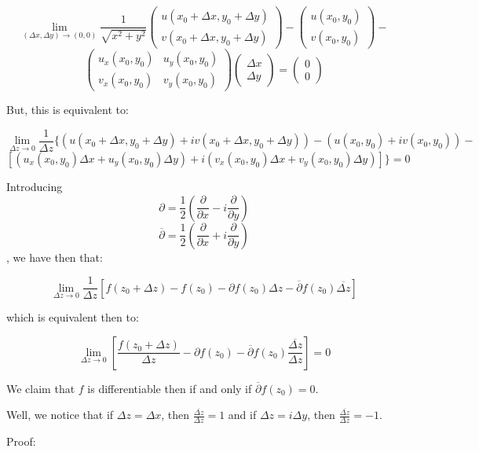 \documentclass[10pt]{article}
\begin{document}
$$ \lim_{(\Delta x, \Delta y) \to (0,0)} \frac{1}{\sqrt{x^2 + y^2}} \begin{pmatrix} u(x_0 + \Delta x, y_0 + \Delta y) \\ v(x_0 + \Delta x, y_0 + \Delta y) \end{pmatrix} - \begin{pmatrix} u(x_0, y_0) \\ v(x_0, y_0) \end{pmatrix}  - $$
$$\begin{pmatrix} u_x(x_0,y_0) & u_y(x_0, y_0) \\ v_x(x_0, y_0) & v_y(x_0, y_0) \end{pmatrix} \begin{pmatrix} \Delta x \\ \Delta y \end{pmatrix} = \begin{pmatrix} 0 \\0 \end{pmatrix} $$

But, this is equivalent to:

$$ \lim_{\Delta z \to 0 }\frac{1}{\Delta z} \{(u(x_0 + \Delta x, y_0 + \Delta y) + i v(x_0 + \Delta x, y_0 + \Delta y) ) - (u(x_0, y_0) + i v(x_0, y_0)) - $$
$$[(u_x(x_0, y_0) \Delta x + u_y(x_0, y_0) \Delta y) + i (v_x(x_0, y_0) \Delta x + v_y(x_0,y_0) \Delta y)] \}= 0$$

Introducing 
$$\partial = \frac{1}{2} \left(\frac{\partial}{\partial x} - i \frac{\partial}{\partial y}\right)$$
$$\overline{\partial} = \frac{1}{2} \left(\frac{\partial}{\partial x} + i \frac{\partial}{\partial y}\right)$$, we have then that:

$$\lim_{\Delta z \to 0 }\frac{1}{\Delta z} [ f(z_0 + \Delta z) - f(z_0) - \partial f(z_0) \Delta z - \overline{\partial} f(z_0) \overline{\Delta z}] $$

which is equivalent then to:

$$ \lim_{\Delta z \to 0 } \left[ \frac{ f(z_0 + \Delta z)}{\Delta z} - \partial f(z_0) - \overline{\partial} f(z_0) \frac{\overline{\Delta z}}{\Delta z} \right] = 0 $$

We claim that $f$ is differentiable then if and only if $\overline{\partial} f(z_0) = 0$. 

Well, we notice that if $\Delta z = \Delta x$, then $ \frac{\overline{\Delta z}}{\Delta z} = 1$ and if $\Delta z = i \Delta y$, then $ \frac{\overline{\Delta z}}{\Delta z} = -1$.

Proof:
\end{document}
